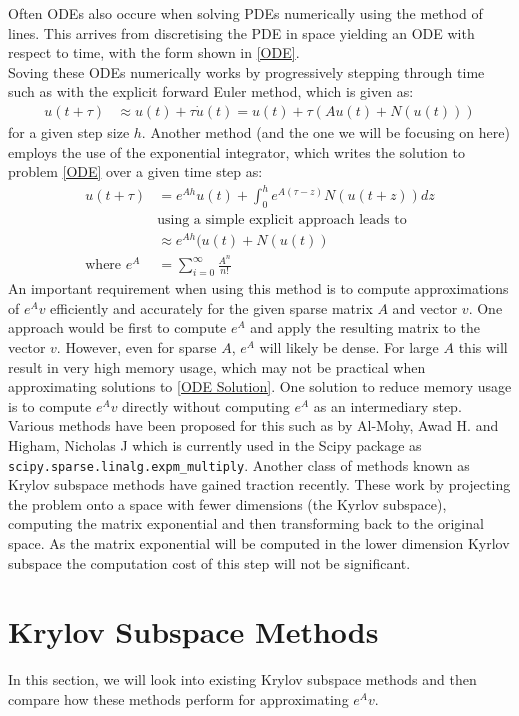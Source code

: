 \documentclass{article}
\begin{document}
Often ODEs also occure when solving PDEs numerically using the method of lines.
This arrives from discretising the PDE in space yielding an ODE with respect to time, with the form shown in \eqref{ODE}.\\
Soving these ODEs numerically works by progressively stepping through time such as with the explicit forward Euler method, which is given as:
\begin{align*}
u(t+\tau) &\approx u(t) + \tau\dot u(t) = u(t) + \tau(Au(t) + N(u(t)))
\end{align*}
for a given step size $h$.
Another method (and the one we will be focusing on here) employs the use of the exponential integrator, which writes the solution to problem \eqref{ODE} over a given time step as:
\begin{align*}
u(t+\tau) &= e^{Ah}u(t) + \int_0^h e^{A(\tau-z)}N(u(t+z)) dz \label{ODE Solution}\\
&\text{using a simple explicit approach leads to}\\
&\approx e^{Ah}(u(t) + N(u(t))\\
\text{where } e^{A} &= \sum^{\infty}_{i = 0}\frac{A^n}{n!}
\end{align*}
An important requirement when using this method is to compute approximations of $e^{A}v$ efficiently and accurately for the given sparse matrix $A$ and vector $v$.
One approach would be first to compute $e^A$ and apply the resulting matrix to the vector $v$.
However, even for sparse $A$, $e^{A}$ will likely be dense. For large $A$ this will result in very high memory usage, which may not be practical when approximating solutions to \eqref{ODE Solution}.
One solution to reduce memory usage is to compute $e^{A}v$ directly without computing $e^{A}$ as an intermediary step.\\
Various methods have been proposed for this such as by Al-Mohy, Awad H. and Higham, Nicholas J\cite{AlMohy2011} which is currently used in the Scipy package as \verb|scipy.sparse.linalg.expm_multiply|.
Another class of methods known as Krylov subspace methods have gained traction recently\cite{Moler2003}.
These work by projecting the problem onto a space with fewer dimensions (the Kyrlov subspace), computing the matrix exponential and then transforming back to the original space.
As the matrix exponential will be computed in the lower dimension Kyrlov subspace the computation cost of this step will not be significant.
\section{Krylov Subspace Methods}
In this section, we will look into existing Krylov subspace methods and then compare how these methods perform for approximating $e^{A}v$.
\end{document}
